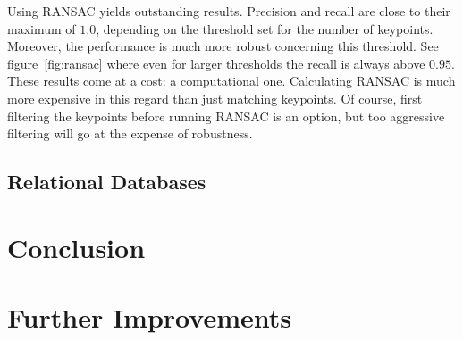 \documentclass{ltjarticle}
\begin{document}
Using RANSAC yields outstanding results. Precision and recall are close to their maximum of $1.0$, depending on the threshold set for the number of keypoints. Moreover, the performance is much more robust concerning this threshold. See figure~\ref{fig:ransac} where even for larger thresholds the recall is always above $0.95$. These results come at a cost: a computational one. Calculating RANSAC is much more expensive in this regard than just matching keypoints. Of course, first filtering the keypoints before running RANSAC is an option, but too aggressive filtering will go at the expense of robustness.

\subsection{Relational Databases}

\section{Conclusion}

\section{Further Improvements}

\printbibliography
\end{document}
